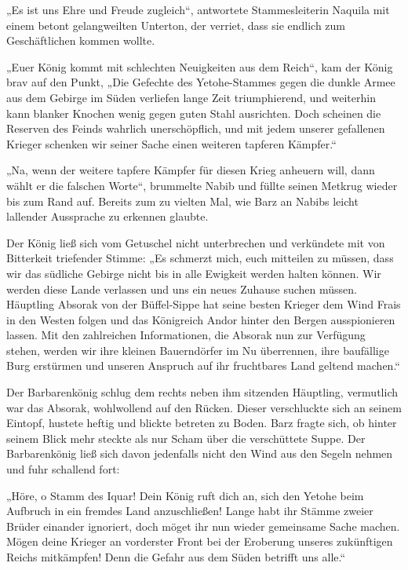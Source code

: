 „Es ist uns Ehre und Freude zugleich“, antwortete Stammesleiterin Naquila mit einem betont gelangweilten Unterton, der verriet, dass sie endlich zum Geschäftlichen kommen wollte.

„Euer König kommt mit schlechten Neuigkeiten aus dem Reich“, kam der König brav auf den Punkt, „Die Gefechte des Yetohe-Stammes gegen die dunkle Armee aus dem Gebirge im Süden verliefen lange Zeit triumphierend, und weiterhin kann blanker Knochen wenig gegen guten Stahl ausrichten. Doch scheinen die Reserven des Feinds wahrlich unerschöpflich, und mit jedem unserer gefallenen Krieger schenken wir seiner Sache einen weiteren tapferen Kämpfer.“

„Na, wenn der weitere tapfere Kämpfer für diesen Krieg anheuern will, dann wählt er die falschen Worte“, brummelte Nabib und füllte seinen Metkrug wieder bis zum Rand auf. Bereits zum zu vielten Mal, wie Barz an Nabibs leicht lallender Aussprache zu erkennen glaubte.

Der König ließ sich vom Getuschel nicht unterbrechen und verkündete mit von Bitterkeit triefender Stimme: „Es schmerzt mich, euch mitteilen zu müssen, dass wir das südliche Gebirge nicht bis in alle Ewigkeit werden halten können. Wir werden diese Lande verlassen und uns ein neues Zuhause suchen müssen. Häuptling Absorak von der Büffel-Sippe hat seine besten Krieger dem Wind Frais in den Westen folgen und das Königreich Andor hinter den Bergen ausspionieren lassen. Mit den zahlreichen Informationen, die Absorak nun zur Verfügung stehen, werden wir ihre kleinen Bauerndörfer im Nu überrennen, ihre baufällige Burg erstürmen und unseren Anspruch auf ihr fruchtbares Land geltend machen.“

Der Barbarenkönig schlug dem rechts neben ihm sitzenden Häuptling, vermutlich war das Absorak, wohlwollend auf den Rücken. Dieser verschluckte sich an seinem Eintopf, hustete heftig und blickte betreten zu Boden. Barz fragte sich, ob hinter seinem Blick mehr steckte als nur Scham über die verschüttete Suppe. Der Barbarenkönig ließ sich davon jedenfalls nicht den Wind aus den Segeln nehmen und fuhr schallend fort:

„Höre, o Stamm des Iquar! Dein König ruft dich an, sich den Yetohe beim Aufbruch in ein fremdes Land anzuschließen! Lange habt ihr Stämme zweier Brüder einander ignoriert, doch möget ihr nun wieder gemeinsame Sache machen. Mögen deine Krieger an vorderster Front bei der Eroberung unseres zukünftigen Reichs mitkämpfen! Denn die Gefahr aus dem Süden betrifft uns alle.“

